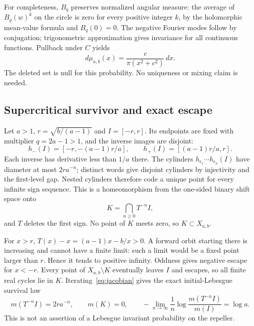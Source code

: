 For completeness, $B_q$ preserves normalized angular measure: the average of
$B_q(w)^k$ on the circle is zero for every positive integer $k$, by the
holomorphic mean-value formula and $B_q(0)=0$. The negative Fourier modes
follow by conjugation; trigonometric approximation gives invariance for all
continuous functions. Pullback under $C$ yields
\begin{equation}\label{eq:cauchy}
 d\mu_{a,b}(x)=\frac{c}{\pi(x^2+c^2)}\,dx.
\end{equation}
The deleted set is null for this probability. No uniqueness or mixing claim
is needed.

\subsection{Supercritical survivor and exact escape}

Let $a>1$, $r=\sqrt{b/(a-1)}$ and $I=[-r,r]$. Its endpoints are fixed with
multiplier $q=2a-1>1$, and the inverse images are disjoint:
\begin{equation}\label{eq:intervals}
 h_-(I)=[-r,-(a-1)r/a],\qquad h_+(I)=[(a-1)r/a,r].
\end{equation}
Each inverse has derivative less than $1/a$ there. The cylinders
$h_{\epsilon_1}\cdots h_{\epsilon_n}(I)$ have diameter at most $2ra^{-n}$;
distinct words give disjoint cylinders by injectivity and the first-level gap.
Nested cylinders therefore code a unique point for every infinite sign
sequence. This is a homeomorphism from the one-sided binary shift space onto
\begin{equation}\label{eq:survivor}
 K=\bigcap_{n\ge0}T^{-n}I,
\end{equation}
and $T$ deletes the first sign. No point of $K$ meets zero, so $K\subset X_{a,b}$.

For $x>r$, $T(x)-x=(a-1)x-b/x>0$. A forward orbit starting there is increasing
and cannot have a finite limit: such a limit would be a fixed point larger
than $r$. Hence it tends to positive infinity. Oddness gives negative escape
for $x<-r$. Every point of $X_{a,b}\setminus K$ eventually leaves $I$ and
escapes, so all finite real cycles lie in $K$. Iterating~\eqref{eq:jacobian}
gives the exact initial-Lebesgue survival law
\begin{equation}\label{eq:escape}
 m(T^{-n}I)=2ra^{-n},\qquad m(K)=0,
 \qquad-\lim_{n\to\infty}\frac1n\log\frac{m(T^{-n}I)}{m(I)}=\log a.
\end{equation}
This is not an assertion of a Lebesgue invariant probability on the repeller.

